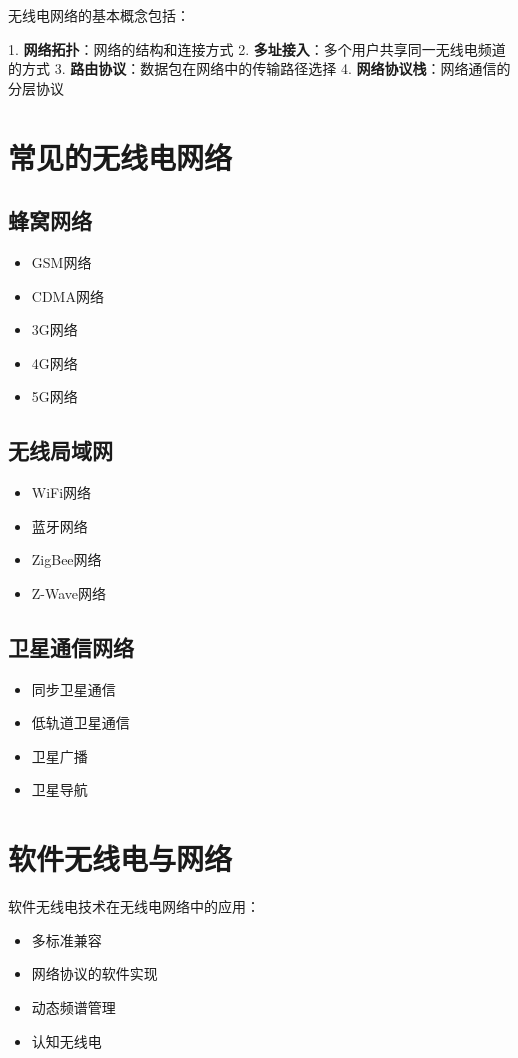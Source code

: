 \documentclass[12pt,UTF8]{ctexbook}
\begin{document}
无线电网络的基本概念包括：

1. \textbf{网络拓扑}：网络的结构和连接方式
2. \textbf{多址接入}：多个用户共享同一无线电频道的方式
3. \textbf{路由协议}：数据包在网络中的传输路径选择
4. \textbf{网络协议栈}：网络通信的分层协议

\section{常见的无线电网络}

\subsection{蜂窝网络}\begin{itemize}
  \item GSM网络
  \item CDMA网络
  \item 3G网络
  \item 4G网络
  \item 5G网络\end{itemize}

\subsection{无线局域网}\begin{itemize}
  \item WiFi网络
  \item 蓝牙网络
  \item ZigBee网络
  \item Z-Wave网络\end{itemize}

\subsection{卫星通信网络}\begin{itemize}
  \item 同步卫星通信
  \item 低轨道卫星通信
  \item 卫星广播
  \item 卫星导航\end{itemize}

\section{软件无线电与网络}

软件无线电技术在无线电网络中的应用：\begin{itemize}
  \item 多标准兼容
  \item 网络协议的软件实现
  \item 动态频谱管理
  \item 认知无线电\end{itemize}
\end{document}

